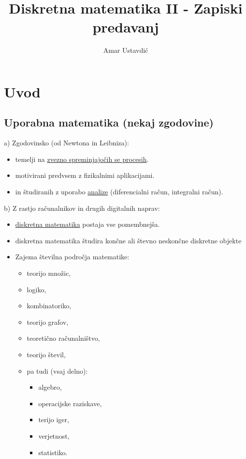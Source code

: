 \documentclass[12pt]{article}
\title{Diskretna matematika II - Zapiski predavanj}
\date{}
\author{Amar Ustavdić}
\begin{document}
\maketitle
\clearpage 

\tableofcontents
\clearpage

\section{Uvod}
\subsection{Uporabna matematika (nekaj zgodovine)}

a) Zgodovinsko (od Newtona in Leibniza):
\begin{itemize}
    \item temelji na \underline{zvezno spreminjajočih se procesih}.
    \item motivirani predvsem z fizikalnimi aplikacijami.
    \item in študiranih z uporabo \underline{analize} (diferencialni račun, integralni račun).
\end{itemize}
b) Z rastjo računalnikov in drugih digitalnih naprav:
\begin{itemize}
    \item \underline{diskretna matematika} postaja vse pomembnejša.
    \item diskretna matematika študira končne ali števno neskončne diskretne objekte
    \item Zajema številna področja matematike: 
    \begin{itemize}
        \item teorijo množic, 
        \item logiko, 
        \item kombinatoriko, 
        \item teorijo grafov, 
        \item teoretično računalništvo, 
        \item teorijo števil, 
        \item pa tudi (vsaj delno): 
        \begin{itemize}
            \item algebro, 
            \item operacijske raziskave, 
            \item terijo iger, 
            \item verjetnost, 
            \item statistiko.
        \end{itemize}
    \end{itemize}
\end{itemize}
\end{document}
